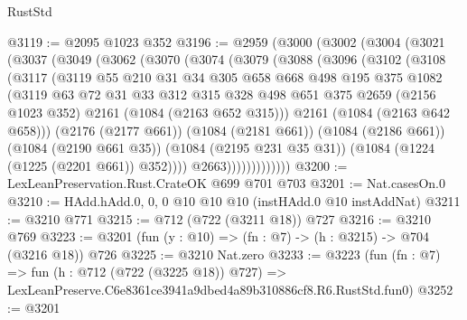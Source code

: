 \begin{lexlean}{RustStd}
\begin{coremodule}
@3119 := @2095 @1023 @352
@3196 := @2959
    (@3000
      (@3002
        (@3004
          (@3021
            (@3037
              (@3049
                (@3062
                  (@3070
                    (@3074
                      (@3079
                        (@3088
                          (@3096
                            (@3102
                              (@3108
                                (@3117
                                  (@3119
                                    @55
                                    @210
                                    @31
                                    @34
                                    @305
                                    @658
                                    @668
                                    @498
                                    @195
                                    @375
                                    @1082
                                    (@3119
                                      @63
                                      @72
                                      @31
                                      @33
                                      @312
                                      @315
                                      @328
                                      @498
                                      @651
                                      @375
                                      @2659
                                      (@2156 @1023 @352)
                                      @2161
                                      (@1084 (@2163 @652 @315)))
                                    @2161
                                    (@1084 (@2163 @642 @658)))
                                  (@2176 (@2177 @661))
                                  (@1084 (@2181 @661))
                                  (@1084 (@2186 @661))
                                  (@1084 (@2190 @661 @35))
                                  (@1084 (@2195 @231 @35 @31))
                                  (@1084 (@1224 (@1225 (@2201 @661)) @352))))
                              @2663)))))))))))))
@3200 := LexLeanPreservation.Rust.CrateOK @699 @701 @703
@3201 := Nat.casesOn.{0}
@3210 := HAdd.hAdd.{0, 0, 0} @10 @10 @10 (instHAdd.{0} @10 instAddNat)
@3211 := @3210 @771
@3215 := @712 (@722 (@3211 @18)) @727
@3216 := @3210 @769
@3223 := @3201 (fun (y : @10) => (fn : @7) -> (h : @3215) -> @704 (@3216 @18)) @726
@3225 := @3210 Nat.zero
@3233 := @3223
    (fun (fn : @7) =>
    fun (h : @712 (@722 (@3225 @18)) @727) =>
    LexLeanPreserve.C6e8361ce3941a9dbed4a89b310886cf8.R6.RustStd.fun0)
@3252 := @3201

\end{coremodule}
\end{lexlean}
